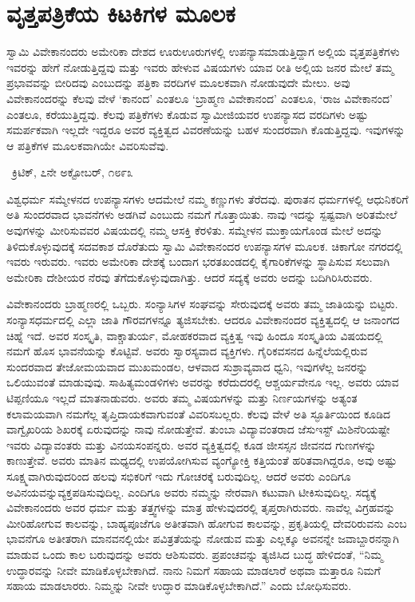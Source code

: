 
\chapter{ವೃತ್ತಪತ್ರಿಕೆಯ ಕಿಟಕಿಗಳ ಮೂಲಕ}

ಸ್ವಾಮಿ ವಿವೇಕಾನಂದರು ಅಮೇರಿಕಾ ದೇಶದ ಊರುಊರುಗಳಲ್ಲಿ ಉಪನ್ಯಾಸ\break ಮಾಡುತ್ತಿದ್ದಾಗ ಅಲ್ಲಿಯ ವೃತ್ತಪತ್ರಿಕೆಗಳು ಇವರನ್ನು ಹೇಗೆ ನೋಡುತ್ತಿದ್ದವು ಮತ್ತು ಇವರು ಹೇಳುವ ವಿಷಯಗಳು ಯಾವ ರೀತಿ ಅಲ್ಲಿಯ ಜನರ ಮೇಲೆ ತಮ್ಮ ಪ್ರಭಾವವನ್ನು ಬೀರಿದವು ಎಂಬುದನ್ನು ಪತ್ರಿಕಾ ವರದಿಗಳ ಮೂಲಕವಾಗಿ ನೋಡುವುದೇ ಮೇಲು. ಅವು ವಿವೇಕಾನಂದರನ್ನು ಕೆಲವು ವೇಳೆ ‘ಕಾನಂದ’ ಎಂತಲೂ ‘ಬ್ರಾಹ್ಮಣ ವಿವೇಕಾನಂದ’ ಎಂತಲೂ, ‘ರಾಜ ವಿವೇಕಾನಂದ’ ಎಂತಲೂ, ಕರೆಯುತ್ತಿದ್ದವು. ಕೆಲವು ಪತ್ರಿಕೆಗಳು ಕೊಡುವ ಸ್ವಾಮೀಜಿಯವರ ಉಪನ್ಯಾಸದ ವರದಿಗಳು ಅಷ್ಟು ಸಮರ್ಪಕವಾಗಿ ಇಲ್ಲದೇ ಇದ್ದರೂ ಅವರ ವ್ಯಕ್ತಿತ್ವದ ವಿವರಣೆಯನ್ನು ಬಹಳ ಸುಂದರವಾಗಿ ಕೊಡುತ್ತಿದ್ದವು. ಇವುಗಳನ್ನು ಆ ಪತ್ರಿಕೆಗಳ ಮೂಲಕವಾಗಿಯೇ ವಿವರಿಸುವೆವು.

~\hfill{\fontsize{11pt}{13.75pt}\selectfont ಕ್ರಿಟಿಕ್, ೭ನೇ ಅಕ್ಟೋಬರ್, ೧೮೯೩}

 ವಿಶ್ವಧರ್ಮ ಸಮ್ಮೇಳನದ ಉಪನ್ಯಾಸಗಳು ಆದಮೇಲೆ ನಮ್ಮ ಕಣ್ಣುಗಳು ತೆರೆದವು. ಪುರಾತನ ಧರ್ಮಗಳಲ್ಲಿ ಆಧುನಿಕರಿಗೆ ಅತಿ ಸುಂದರವಾದ ಭಾವನೆಗಳು ಅಡಗಿವೆ ಎಂಬುದು ನಮಗೆ ಗೊತ್ತಾಯಿತು. ನಾವು ಇದನ್ನು ಸ್ಪಷ್ಟವಾಗಿ ಅರಿತಮೇಲೆ ಅವುಗಳನ್ನು ಮೀರಿಸುವವರ ವಿಷಯದಲ್ಲಿ ನಮ್ಮ ಆಸಕ್ತಿ ಕೆರಳಿತು. ಸಮ್ಮೇಳನ ಮುಕ್ತಾಯಗೊಂಡ ಮೇಲೆ ಅದನ್ನು ತಿಳಿದುಕೊಳ್ಳುವುದಕ್ಕೆ ಸದವಕಾಶ ದೊರೆತುದು ಸ್ವಾಮಿ ವಿವೇಕಾನಂದರ ಉಪನ್ಯಾಸಗಳ ಮೂಲಕ. ಚಿಕಾಗೋ ನಗರದಲ್ಲಿ ಇವರು ಇರುವರು. ಇವರು ಅಮೇರಿಕಾ ದೇಶಕ್ಕೆ ಬಂದಾಗ ಭರತಖಂಡದಲ್ಲಿ ಕೈಗಾರಿಕೆಗಳನ್ನು ಸ್ಥಾಪಿಸುವ ಸಲುವಾಗಿ ಅಮೇರಿಕಾ ದೇಶೀಯರ ನೆರವು ತೆಗೆದುಕೊಳ್ಳುವುದಾಗಿತ್ತು. ಆದರೆ ಸದ್ಯಕ್ಕೆ ಅವರು ಅದನ್ನು ಬದಿಗಿರಿಸಿರುವರು. 

 ವಿವೇಕಾನಂದರು ಬ್ರಾಹ್ಮಣರಲ್ಲಿ ಒಬ್ಬರು. ಸಂನ್ಯಾಸಿಗಳ ಸಂಘವನ್ನು ಸೇರುವುದಕ್ಕೆ ಅವರು ತಮ್ಮ ಜಾತಿಯನ್ನು ಬಿಟ್ಟರು. ಸಂನ್ಯಾಸಧರ್ಮದಲ್ಲಿ ಎಲ್ಲಾ ಜಾತಿ ಗೌರವಗಳನ್ನೂ ತ್ಯಜಿಸಬೇಕು. ಆದರೂ ವಿವೇಕಾನಂದರ ವ್ಯಕ್ತಿತ್ವದಲ್ಲಿ ಆ ಜನಾಂಗದ ಚಿಹ್ನೆ ಇದೆ. ಅವರ ಸಂಸ್ಕೃತಿ, ವಾಕ್ಚಾತುರ್ಯ, ಮೋಹಕರವಾದ ವ್ಯಕ್ತಿತ್ವ ಇವು ಹಿಂದೂ ಸಂಸ್ಕೃತಿಯ ವಿಷಯದಲ್ಲಿ ನಮಗೆ ಹೊಸ ಭಾವನೆಯನ್ನು ಕೊಟ್ಟಿವೆ. ಅವರು ಸ್ವಾರಸ್ಯವಾದ ವ್ಯಕ್ತಿಗಳು. ಗೈರಿಕವಸನದ ಹಿನ್ನೆಲೆಯಲ್ಲಿರುವ ಸುಂದರವಾದ ತೇಜೋಮಯವಾದ ಮುಖಮಂಡಲ, ಆಳವಾದ ಸುಶ್ರಾವ್ಯವಾದ ಧ್ವನಿ, ಇವುಗಳೆಲ್ಲ ಜನರನ್ನು ಒಲಿಯುವಂತೆ ಮಾಡುವುವು. ಸಾಹಿತ್ಯಮಂಡಳಿಗಳು ಅವರನ್ನು ಕರೆದುದರಲ್ಲಿ ಆಶ್ಚರ್ಯವೇನೂ ಇಲ್ಲ. ಅವರು ಯಾವ ಟಿಪ್ಪಣಿಯೂ ಇಲ್ಲದೆ ಮಾತನಾಡುವರು. ಅವರು ತಮ್ಮ ವಿಷಯಗಳನ್ನು ಮತ್ತು ನಿರ್ಣಯಗಳನ್ನು ಅತ್ಯಂತ ಕಲಾಮಯವಾಗಿ ನಮಗೆಲ್ಲ ತೃಪ್ತಿದಾಯಕವಾಗುವಂತೆ ವಿವರಿಸಬಲ್ಲರು. ಕೆಲವು ವೇಳೆ ಅತಿ ಸ್ಫೂರ್ತಿಯಿಂದ ಕೂಡಿದ ವಾಗ್ವೈಖರಿಯ ಶಿಖರಕ್ಕೆ ಏರುವುದನ್ನು ನಾವು ನೋಡುತ್ತೇವೆ. ತುಂಬಾ ವಿದ್ಯಾವಂತರಾದ ಜೆಸುಇಸ್ಟ್ ಮಿಶಿನೆರಿಯಷ್ಟೇ ಇವರು ವಿದ್ಯಾವಂತರು ಮತ್ತು ವಿನಯಸಂಪನ್ನರು. ಅವರ ವ್ಯಕ್ತಿತ್ವದಲ್ಲಿ ಕೂಡ ಜೀಸಸ್ಸನ ಜೀವನದ ಗುಣಗಳನ್ನು ಕಾಣುತ್ತೇವೆ. ಅವರು ಮಾತಿನ ಮಧ್ಯದಲ್ಲಿ ಉಪಯೋಗಿಸುವ ವ್ಯಂಗ್ಯೋಕ್ತಿ ಕತ್ತಿಯಂತೆ ಹರಿತವಾಗಿದ್ದರೂ, ಅವು ಅಷ್ಟು ಸೂಕ್ಷ್ಮವಾಗಿರುವುದರಿಂದ ಹಲವು ಸಭಿಕರಿಗೆ ಇದು ಗೋಚರಕ್ಕೆ ಬರುವುದಿಲ್ಲ. ಆದರೆ ಅವರು ಎಂದಿಗೂ ಅವಿನಯವನ್ನು\break ವ್ಯಕ್ತಪಡಿಸುವುದಿಲ್ಲ. ಎಂದಿಗೂ ಅವರು ನಮ್ಮನ್ನು ನೇರವಾಗಿ ಕಟುವಾಗಿ ಟೀಕಿಸುವುದಿಲ್ಲ. ಸದ್ಯಕ್ಕೆ ವಿವೇಕಾನಂದರು ಅವರ ಧರ್ಮ ಮತ್ತು ತತ್ತ್ವಗಳನ್ನು ಮಾತ್ರ ಹೇಳುವುದರಲ್ಲಿ ತೃಪ್ತರಾಗಿರುವರು. ನಾವೆಲ್ಲ ವಿಗ್ರಹವನ್ನು ಮೀರಿಹೋಗುವ ಕಾಲವನ್ನು, ಬಾಹ್ಯಪೂಜೆಗೂ ಅತೀತವಾಗಿ ಹೋಗುವ ಕಾಲವನ್ನು, ಪ್ರಕೃತಿಯಲ್ಲಿ ದೇವರಿರುವನು ಎಂಬ ಭಾವನೆಗೂ ಅತೀತರಾಗಿ ಮಾನವನಲ್ಲಿಯೇ ಪವಿತ್ರತೆಯನ್ನು ನೋಡುವ ಮತ್ತು ಎಲ್ಲಕ್ಕೂ ಅವನನ್ನೇ ಜವಾಬ್ದಾರನನ್ನಾಗಿ ಮಾಡುವ ಒಂದು ಕಾಲ ಬರುವುದನ್ನು ಅವರು ಆಶಿಸುವರು. ಪ್ರಪಂಚವನ್ನು ತ್ಯಜಿಸಿದ ಬುದ್ಧ ಹೇಳಿದಂತೆ, “ನಿಮ್ಮ ಉದ್ಧಾರವನ್ನು ನೀವೇ ಮಾಡಿಕೊಳ್ಳಬೇಕಾಗಿದೆ. ನಾನು ನಿಮಗೆ ಸಹಾಯ ಮಾಡಲಾರೆ ಅಥವಾ ಮತ್ತಾರೂ ನಿಮಗೆ ಸಹಾಯ ಮಾಡಲಾರರು. ನಿಮ್ಮನ್ನು ನೀವೇ ಉದ್ಧಾರ ಮಾಡಿಕೊಳ್ಳಬೇಕಾಗಿದೆ.” ಎಂದು ಬೋಧಿಸುವರು.

